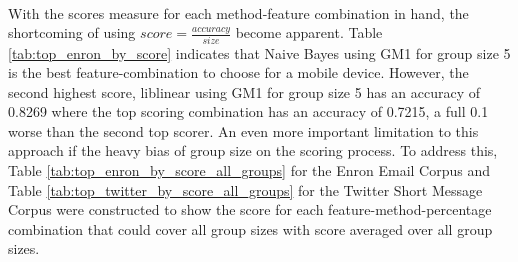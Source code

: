 \paragraph{} With the scores measure for each method-feature combination in hand, the shortcoming of using $score = \frac{accuracy}{size}$ become apparent.  Table \ref{tab:top_enron_by_score} indicates that Naive Bayes using GM1 for group size 5 is the best feature-combination to choose for a mobile device.  However, the second highest score, liblinear using GM1 for group size 5 has an accuracy of 0.8269 where the top scoring combination has an accuracy of 0.7215, a full 0.1 worse than the second top scorer.  An even more important limitation to this approach if the heavy bias of group size on the scoring process.  To address this, Table \ref{tab:top_enron_by_score_all_groups} for the Enron Email Corpus and Table \ref{tab:top_twitter_by_score_all_groups} for the Twitter Short Message Corpus were constructed to show the score for each feature-method-percentage combination that could cover all group sizes with score averaged over all group sizes.


